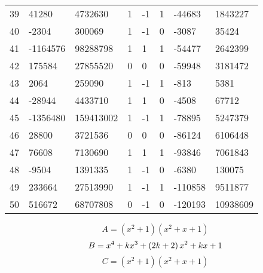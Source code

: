 \documentclass{amsart}
\begin{document}
\begin{longtable}{|l|l|l|lllll|}
39&41280&4732630&1&-1&1&-44683&1843227\\
40&-2304&300069&1&-1&0&-3087&35424\\
41&-1164576&98288798&1&1&1&-54477&2642399\\
42&175584&27855520&0&0&0&-59948&3181472\\
43&2064&259090&1&-1&1&-813&5381\\
44&-28944&4433710&1&1&0&-4508&67712\\
45&-1356480&159413002&1&-1&1&-78895&5247379\\
46&28800&3721536&0&0&0&-86124&6106448\\
47&76608&7130690&1&1&1&-93846&7061843\\
48&-9504&1391335&1&-1&0&-6380&130075\\
49&233664&27513990&1&-1&1&-110858&9511877\\
50&516672&68707808&0&-1&0&-120193&10938609\\
\hline
\end{longtable}
$$A=(x^2
 + 1)(x^2
 + x
 + 1)$$
$$B=x^4
 + k\*x^3
 + \left(2\*k
 + 2\right) \*x^2
 + k\*x
 + 1$$
$$C=(x^2
 + 1)(x^2
 + x
 + 1)$$
\end{document}
